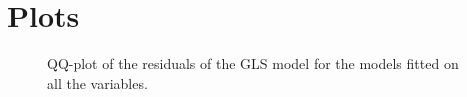 
\chapter{Plots}
\label{ch:plots}
\begin{figure}
\caption{\label{fig:ResidualGLSAll}QQ-plot of the residuals of the GLS model for the models fitted on all the variables.}
\end{figure}


